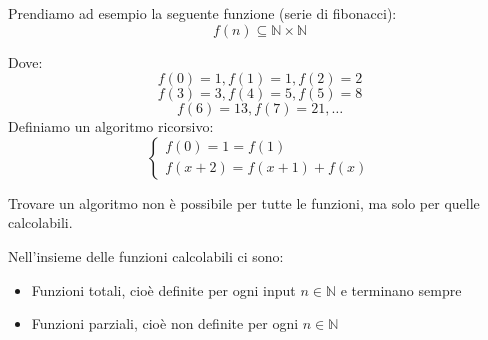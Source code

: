 \documentclass[a4paper]{article}
\begin{document}
\begin{example}
  Prendiamo ad esempio la seguente funzione (serie di fibonacci):
  \[
    f(n) \subseteq \mathbb{N} \times \mathbb{N}
  \] 

  \vspace{1em}
  \noindent
  Dove:
  \[
    f(0) = 1, f(1) = 1, f(2) = 2
  \] 
  \[
    f(3) = 3, f(4) = 5, f(5) = 8
  \] 
  \[
    f(6) = 13, f(7) = 21, \ldots
  \] 
  Definiamo un algoritmo ricorsivo:
  \[
    \begin{cases}
      f(0) = 1 = f(1)\\
      f(x+2) = f(x+1) + f(x)
    \end{cases}
  \] 

  \vspace{1em}
  \noindent
  Trovare un algoritmo non è possibile per tutte le funzioni, ma solo per quelle calcolabili.
\end{example}
Nell'insieme delle funzioni calcolabili ci sono:
\begin{itemize}
  \item Funzioni totali, cioè definite per ogni input \( n \in \mathbb{N} \) e terminano
    sempre
  \item Funzioni parziali, cioè non definite per ogni \( n \in \mathbb{N} \)
\end{itemize}
\end{document}
